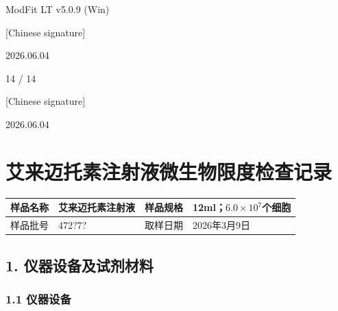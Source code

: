 \documentclass[UTF8,10pt,a4paper,fontset=fandol]{ctexart}
\newcommand{\fieldvalue}[1]{#1}
\newcommand{\handwritten}[1]{#1}
\begin{document}
\noindent\scriptsize ModFit LT v5.0.9 (Win)

\vfill

\handwritten{[Chinese signature]}

\handwritten{2026.06.04}

\handwritten{14 / 14}

\handwritten{[Chinese signature]}

\handwritten{2026.06.04}

\newpage

\section{艾来迈托素注射液微生物限度检查记录}

\begin{tabular}{|p{3.0cm}|p{5.0cm}|p{2.8cm}|p{5.0cm}|}
\hline
样品名称 &
\fieldvalue{艾来迈托素注射液} &
样品规格 &
\fieldvalue{12ml；$6.0\times10^{7}$个细胞}
\\ \hline
样品批号 &
\fieldvalue{\handwritten{472?7?}} &
取样日期 &
\fieldvalue{\handwritten{2026年3月9日}}
\\ \hline
\end{tabular}

\subsection{1. 仪器设备及试剂材料}

\subsubsection{1.1 仪器设备}
\end{document}
